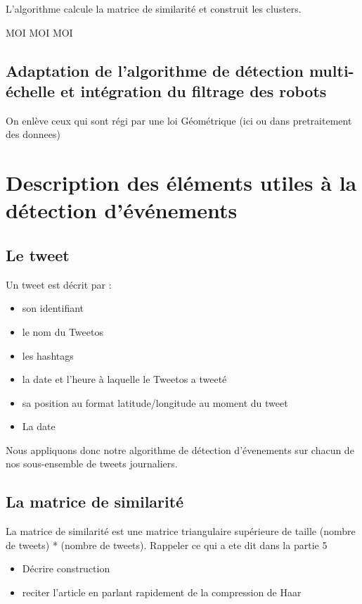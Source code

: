 \documentclass[12pt]{article}
\begin{document}
L'algorithme calcule la matrice de similarit\'e et construit les clusters.

MOI
\newline 
MOI 
\newline
MOI

\subsection{Adaptation de l'algorithme de d\'etection multi-\'echelle et int\'egration du filtrage des robots}

On enl\`eve ceux qui sont r\'egi par une loi G\'eom\'etrique (ici ou dans pretraitement des donnees)

\newpage

\section{Description des \'el\'ements utiles \`a la d\'etection d'\'ev\'enements}

\subsection{Le tweet}
Un tweet est d\'ecrit par : 

\begin{itemize}
\item son identifiant
\item le nom du Tweetos
\item les hashtags
\item la date et l'heure \`a laquelle le Tweetos a tweet\'e
\item sa position au format latitude/longitude au moment du tweet
\item La date
\end{itemize}

Nous appliquons donc notre algorithme de d\'etection d'\'evenements sur chacun de nos sous-ensemble de tweets journaliers.

\subsection{La matrice de similarit\'e}
La matrice de similarit\'e est une matrice triangulaire sup\'erieure de taille (nombre de
tweets) * (nombre de tweets).
\newline
Rappeler ce qui a ete dit dans la partie 5
\begin{itemize}
	\item D\'ecrire construction
	\item reciter l'article en parlant rapidement de la compression de Haar
\end{itemize}
\end{document}
